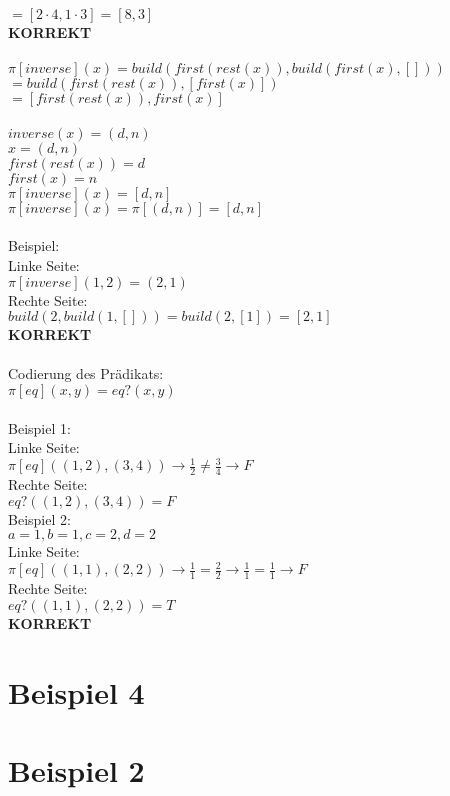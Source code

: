 \documentclass[12pt,runningheads,a4paper]{llncs}
\begin{document}
$= [2\cdot 4, 1 \cdot 3] = [8,3] $\\
\textbf{KORREKT}\\
\\
$\pi[inverse](x) = build(first(rest(x)), build(first(x), []))$\\
$= build(first(rest(x)),[first(x)])$\\
$= [first(rest(x)), first(x)]$\\
\\
$inverse(x) = (d,n)$\\
$x = (d,n)$\\
$first(rest(x)) = d$\\
$first(x) = n$\\
$\pi [inverse](x) = [d,n]$\\
$\pi [inverse](x)= \pi [(d,n)] = [d,n]$\\
\\
Beispiel:\\
Linke Seite:\\
$\pi [inverse](1,2) = (2,1)$\\
Rechte Seite: \\
$build(2, build(1, [])) = build(2, [1]) = [2,1]$\\
\textbf{KORREKT}\\
\\
Codierung des Prädikats:\\
$\pi[eq](x, y) = eq?(x, y)$\\
\\
Beispiel 1:\\
Linke Seite:\\
$\pi[eq]((1,2),(3,4)) \rightarrow \frac{1}{2} \neq \frac{3}{4} \rightarrow F$\\
Rechte Seite:\\
$eq?((1,2), (3,4)) = F$\\
Beispiel 2: \\
$a = 1, b = 1, c = 2, d = 2$\\
Linke Seite:\\
$\pi[eq]((1,1),(2,2)) \rightarrow \frac{1}{1} = \frac{2}{2} \rightarrow \frac{1}{1} = \frac{1}{1} \rightarrow F$\\
Rechte Seite:\\
$eq?((1,1), (2,2)) = T$\\
\textbf{KORREKT}\\
\section*{Beispiel 4}
\section*{Beispiel 2}
\end{document}
